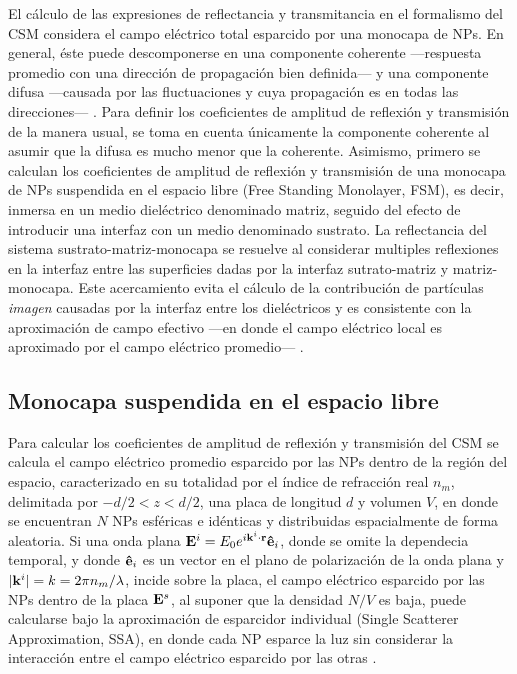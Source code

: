     El cálculo de las expresiones de reflectancia y transmitancia en el formalismo del CSM considera el campo eléctrico total esparcido por una monocapa de NPs. En general, éste puede descomponerse en una componente coherente ---respuesta promedio con una dirección de propagación bien definida--- y una componente difusa ---causada por las fluctuaciones y cuya propagación es en todas las direcciones--- \cite{tsang2000scattering}. Para definir los coeficientes de amplitud de reflexión y transmisión de la manera usual, se toma en cuenta  únicamente la componente coherente al asumir que la difusa es mucho menor que la coherente. Asimismo, primero se calculan los coeficientes de amplitud de reflexión y transmisión de una monocapa de NPs suspendida en el espacio libre (Free Standing Monolayer, FSM), es decir, inmersa en un medio dieléctrico denominado matriz, seguido del efecto de introducir una interfaz con un medio denominado sustrato. La reflectancia del sistema sustrato-matriz-monocapa se resuelve al considerar  multiples reflexiones en la interfaz entre las superficies dadas por la interfaz sutrato-matriz y matriz-monocapa. Este acercamiento evita el  cálculo de la contribución de partículas \emph{imagen} causadas por la  interfaz entre los dieléctricos y es consistente con la aproximación de campo efectivo ---en donde el campo eléctrico local es aproximado por el campo eléctrico promedio--- \cite{reyes2018analytical}.
 
\subsection{Monocapa suspendida en el espacio libre}
 
Para calcular los coeficientes de amplitud de reflexión y transmisión del CSM se calcula el campo eléctrico promedio esparcido por las NPs dentro de la región del espacio, caracterizado en su totalidad por el índice de refracción real $n_m$, delimitada por  $-d/2<z<d/2$, una placa de longitud $d$ y volumen $V$, en donde se encuentran $N$ NPs esféricas e idénticas y distribuidas espacialmente de forma aleatoria. Si una onda plana $\vb{E}^i = E_0 e^{i\vb{k}^i\cdot\vb{r}}\vu{e}_i$, donde se omite la dependecia temporal, y donde $\vu{e}_i$ es un vector en el plano de polarización de la onda plana y $|\vb{k}^i| = k = 2\pi n_m /\lambda$, incide sobre la placa, el campo eléctrico esparcido  por las NPs dentro de la placa $\vb{E}^s$, al suponer que la densidad $N/V$ es baja, puede calcularse bajo la aproximación de esparcidor individual (Single Scatterer Approximation, SSA), en donde cada NP esparce la luz sin considerar la interacción entre el campo eléctrico esparcido por las otras \cite{barrera2003coherent}. 

